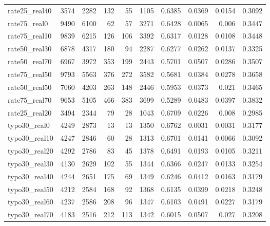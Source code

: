 \documentclass[11pt]{article}
\begin{document}
\begin{table}[H]
\begin{adjustbox}{max width=\textwidth}
\begin{tabular}{lrrrrrrrrr}
rate25\_real40 & 3574 & 2282 & 132 & 55 & 1105 & 0.6385 & 0.0369 & 0.0154 & 0.3092 \\
rate75\_real0 & 9490 & 6100 & 62 & 57 & 3271 & 0.6428 & 0.0065 & 0.006 & 0.3447 \\
rate75\_real10 & 9839 & 6215 & 126 & 106 & 3392 & 0.6317 & 0.0128 & 0.0108 & 0.3448 \\
rate50\_real30 & 6878 & 4317 & 180 & 94 & 2287 & 0.6277 & 0.0262 & 0.0137 & 0.3325 \\
rate50\_real70 & 6967 & 3972 & 353 & 199 & 2443 & 0.5701 & 0.0507 & 0.0286 & 0.3507 \\
rate75\_real50 & 9793 & 5563 & 376 & 272 & 3582 & 0.5681 & 0.0384 & 0.0278 & 0.3658 \\
rate50\_real50 & 7060 & 4203 & 263 & 148 & 2446 & 0.5953 & 0.0373 & 0.021 & 0.3465 \\
rate75\_real70 & 9653 & 5105 & 466 & 383 & 3699 & 0.5289 & 0.0483 & 0.0397 & 0.3832 \\
rate25\_real20 & 3494 & 2344 & 79 & 28 & 1043 & 0.6709 & 0.0226 & 0.008 & 0.2985 \\
typo30\_real0 & 4249 & 2873 & 13 & 13 & 1350 & 0.6762 & 0.0031 & 0.0031 & 0.3177 \\
typo30\_real10 & 4247 & 2846 & 60 & 28 & 1313 & 0.6701 & 0.0141 & 0.0066 & 0.3092 \\
typo30\_real20 & 4292 & 2786 & 83 & 45 & 1378 & 0.6491 & 0.0193 & 0.0105 & 0.3211 \\
typo30\_real30 & 4130 & 2629 & 102 & 55 & 1344 & 0.6366 & 0.0247 & 0.0133 & 0.3254 \\
typo30\_real40 & 4244 & 2651 & 175 & 69 & 1349 & 0.6246 & 0.0412 & 0.0163 & 0.3179 \\
typo30\_real50 & 4212 & 2584 & 168 & 92 & 1368 & 0.6135 & 0.0399 & 0.0218 & 0.3248 \\
typo30\_real60 & 4237 & 2586 & 208 & 96 & 1347 & 0.6103 & 0.0491 & 0.0227 & 0.3179 \\
typo30\_real70 & 4183 & 2516 & 212 & 113 & 1342 & 0.6015 & 0.0507 & 0.027 & 0.3208 \\
\bottomrule
\end{tabular}
\end{adjustbox}
\end{table}
\end{document}
